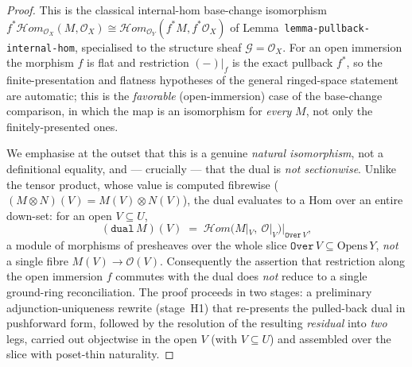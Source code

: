 \begin{proof}
  \leanok
  This is the classical internal-hom base-change isomorphism
  \(f^*\mathcal{H}\!om_{\mathcal{O}_X}(M, \mathcal{O}_X) \cong
  \mathcal{H}\!om_{\mathcal{O}_Y}(f^*M, f^*\mathcal{O}_X)\) of
  Lemma~\texttt{lemma-pullback-internal-hom}, specialised to the structure sheaf
  \(\mathcal{G} = \mathcal{O}_X\). For an open immersion the morphism \(f\) is flat and
  restriction \((-)|_f\) is the exact pullback \(f^*\), so the finite-presentation and
  flatness hypotheses of the general ringed-space statement are automatic; this is the
  \emph{favorable} (open-immersion) case of the base-change comparison, in which the map
  is an isomorphism for \emph{every} \(M\), not only the finitely-presented ones.

  We emphasise at the outset that this is a genuine \emph{natural isomorphism}, not a
  definitional equality, and --- crucially --- that the dual is \emph{not sectionwise}.
  Unlike the tensor product, whose value is computed fibrewise
  (\((M \otimes N)(V) = M(V) \otimes N(V)\)), the dual evaluates to a Hom over an entire
  down-set: for an open \(V \subseteq U\),
  \[
    (\mathtt{dual}\,M)(V)
      \;=\; \mathcal{H}om\bigl(M|_V,\ \mathcal{O}|_V\bigr)\big|_{\mathtt{Over}\,V},
  \]
  a module of morphisms of presheaves over the whole slice \(\mathtt{Over}\,V \subseteq
  \mathrm{Opens}\,Y\), \emph{not} a single fibre \(M(V) \to \mathcal{O}(V)\). Consequently
  the assertion that restriction along the open immersion \(f\) commutes with the dual does
  \emph{not} reduce to a single ground-ring reconciliation. The proof proceeds in two
  stages: a preliminary adjunction-uniqueness rewrite (stage~H1) that re-presents the
  pulled-back dual in pushforward form, followed by the resolution of the resulting
  \emph{residual} into \emph{two} legs, carried out objectwise in the open \(V\) (with
  \(V \subseteq U\)) and assembled over the slice with poset-thin naturality.


\end{proof}
